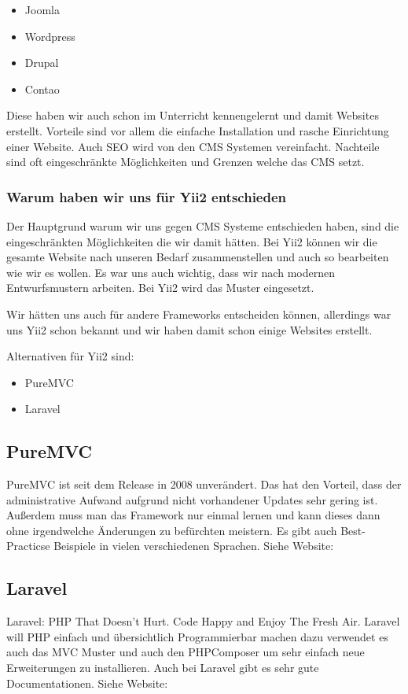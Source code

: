 \begin{itemize}
\item Joomla
\item Wordpress
\item Drupal
\item Contao
\end{itemize}

Diese haben wir auch schon im Unterricht kennengelernt und damit Websites erstellt. Vorteile sind vor allem die einfache Installation und rasche Einrichtung einer Website. Auch SEO wird von den CMS Systemen vereinfacht. Nachteile sind oft eingeschränkte Möglichkeiten und Grenzen welche das CMS setzt.

\subsubsection{Warum haben wir uns für Yii2 entschieden}

Der Hauptgrund warum wir uns gegen CMS Systeme entschieden haben, sind die eingeschränkten Möglichkeiten die wir damit hätten. Bei Yii2 können wir die gesamte Website nach unseren Bedarf zusammenstellen und auch so bearbeiten wie wir es wollen. Es war uns auch wichtig, dass wir nach modernen Entwurfsmustern arbeiten. Bei Yii2 wird das  Muster eingesetzt.

Wir hätten uns auch für andere Frameworks entscheiden können, allerdings war uns Yii2 schon bekannt und wir haben damit schon einige Websites erstellt.

Alternativen für Yii2 sind:

\begin{itemize}
	\item PureMVC
	\item Laravel
\end{itemize}

\subsection{PureMVC}
PureMVC ist seit dem Release in 2008 unverändert. Das hat den Vorteil, dass der administrative Aufwand aufgrund nicht vorhandener Updates sehr gering ist. Außerdem muss man das Framework nur einmal lernen und kann dieses dann ohne irgendwelche Änderungen zu befürchten meistern.
Es gibt auch Best-Practicse Beispiele in vielen verschiedenen Sprachen. Siehe Website: \cite{Pure_MVC}

\subsection{Laravel}
Laravel: PHP That Doesn’t Hurt. Code Happy and Enjoy The Fresh Air.
Laravel will PHP einfach und übersichtlich Programmierbar machen dazu verwendet es auch das MVC Muster und auch den PHPComposer um sehr einfach neue Erweiterungen zu installieren. Auch bei Laravel gibt es sehr gute Documentationen. Siehe Website: \cite{laravel}


